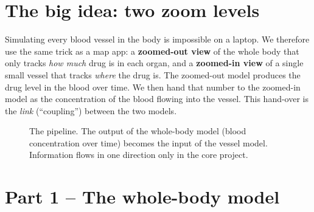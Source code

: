 \documentclass[10.5pt]{article}
\begin{document}
\section{The big idea: two zoom levels}
Simulating every blood vessel in the body is impossible on a laptop. We therefore use the same trick as a map
app: a \textbf{zoomed-out view} of the whole body that only tracks \emph{how much} drug is in each organ, and a
\textbf{zoomed-in view} of a single small vessel that tracks \emph{where} the drug is. The zoomed-out model produces
the drug level in the blood over time. We then hand that number to the zoomed-in model as the concentration of
the blood flowing into the vessel. This hand-over is the \emph{link} (``coupling'') between the two models.

\begin{figure}[H]
\centering
{}
\caption{The pipeline. The output of the whole-body model (blood concentration over time) becomes the input of the
vessel model. Information flows in one direction only in the core project.}
\end{figure}

\section{Part 1 -- The whole-body model}
\end{document}
